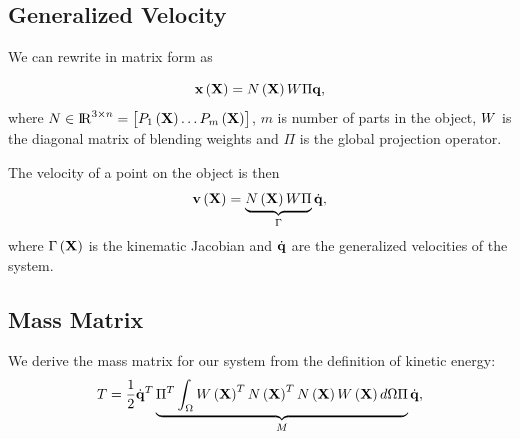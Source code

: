 \subsection{Generalized Velocity}

We can rewrite  in matrix form as 

\begin{equation}
    \mathbf{x}\left(\mathbf{X}\right) = N\left(\mathbf{X}\right)W\Pi\mathbf{q},
\end{equation} where $N\in{\rm I\!R}^{3\times n} = \begin{bmatrix}P_1\left(\mathbf{X}\right) \dots P_m\left(\mathbf{X}\right)\end{bmatrix}$, $m$ is number of 
parts in the object, $W$ is the diagonal matrix of blending weights and $\Pi$ is the global projection operator.

The velocity of a point on the object is then  
\begin{equation}
        \mathbf{v}\left(\mathbf{X}\right) = \underbrace{N\left(\mathbf{X}\right)W\Pi}_{\Gamma}\dot{\mathbf{q}},
    \end{equation} where $\Gamma\left(\mathbf{X}\right)$ is the kinematic Jacobian and $\dot{\mathbf{q}}$ are the generalized velocities of the system.

\subsection{Mass Matrix}
\label{ssec:mass_matrix}

We derive the mass matrix for our system from the definition of kinetic energy:
\begin{equation}
    T = \frac{1}{2}\dot{\mathbf{q}}^T\underbrace{\Pi^T\int_{\Omega}W\left(\mathbf{X}\right)^TN\left(\mathbf{X}\right)^TN\left(\mathbf{X}\right)W\left(\mathbf{X}\right)d\Omega\Pi}_{M}\dot{\mathbf{q}},
\end{equation}


